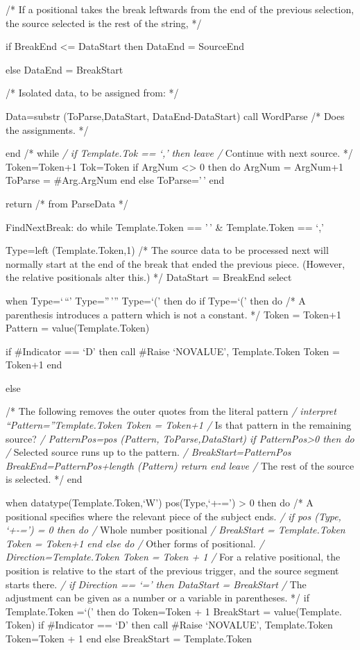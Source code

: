 /* If a positional takes the break leftwards from the end of the
previous selection, the source selected is the rest of the string, */

if BreakEnd \textless= DataStart then DataEnd = SourceEnd

else DataEnd = BreakStart

/* Isolated data, to be assigned from: */

Data=substr (ToParse,DataStart, DataEnd-DataStart) call WordParse /*
Does the assignments. */

end /* while \emph{/ if Template.Tok == `,' then leave /} Continue with
next source. */ Token=Token+1 Tok=Token if ArgNum
\textless\textgreater{} 0 then do ArgNum = ArgNum+1 ToParse =
\#Arg.ArgNum end else ToParse='\,' end

return /* from ParseData */

FindNextBreak: do while Template.Token == '\,' \& Template.Token == `,'

Type=left (Template.Token,1) /* The source data to be processed next
will normally start at the end of the break that ended the previous
piece. (However, the relative positionals alter this.) */ DataStart =
BreakEnd select

when Type=`\,``' \textbar{} Type=''\,''' \textbar{} Type=`(' then do if
Type=`(' then do /* A parenthesis introduces a pattern which is not a
constant. */ Token = Token+1 Pattern = value(Template.Token)

if \#Indicator == `D' then call \#Raise `NOVALUE', Template.Token Token
= Token+1 end

else

/* The following removes the outer quotes from the literal pattern
\emph{/ interpret ``Pattern=''Template.Token Token = Token+1 /} Is that
pattern in the remaining source? \emph{/ PatternPos=pos (Pattern,
ToParse,DataStart) if PatternPos\textgreater0 then do /} Selected source
runs up to the pattern. \emph{/ BreakStart=PatternPos
BreakEnd=PatternPos+length (Pattern) return end leave /} The rest of the
source is selected. */ end

when datatype(Template.Token,`W') \textbar{} pos(Type,`+-=')
\textgreater{} 0 then do /* A positional specifies where the relevant
piece of the subject ends. \emph{/ if pos (Type, `+-=') = 0 then do /}
Whole number positional \emph{/ BreakStart = Template.Token Token =
Token+1 end else do /} Other forms of positional. \emph{/
Direction=Template.Token Token = Token + 1 /} For a relative positional,
the position is relative to the start of the previous trigger, and the
source segment starts there. \emph{/ if Direction == `=' then DataStart
= BreakStart /} The adjustment can be given as a number or a variable in
parentheses. */ if Template.Token =`(' then do Token=Token + 1
BreakStart = value(Template. Token) if \#Indicator == `D' then call
\#Raise `NOVALUE', Template.Token Token=Token + 1 end else BreakStart =
Template.Token

